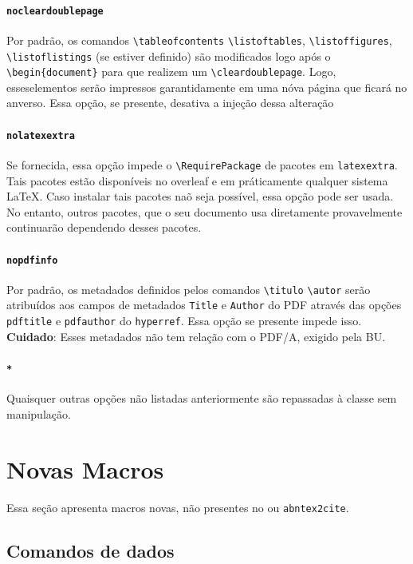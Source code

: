 \documentclass[embeddedlogo]{ufsc-thesis-rn46-2019}
\newcommand{\lacmd}[1]{\texttt{\textbackslash{}#1}}
\begin{document}
\paragraph*{\texttt{nocleardoublepage}} Por padrão, os comandos
\lacmd{tableofcontents} \lacmd{listoftables}, \lacmd{listoffigures},
\lacmd{listoflistings} (se estiver definido) são modificados logo após o
\lacmd{begin\{document\}} para que realizem um \lacmd{cleardoublepage}. Logo,
esseselementos serão impressos garantidamente em uma nóva página que ficará no
anverso. Essa opção, se presente, desativa a injeção dessa alteração

\paragraph*{\texttt{nolatexextra}}
Se fornecida, essa opção impede o \lacmd{RequirePackage} de pacotes em \texttt{latexextra}.
Tais pacotes estão disponíveis no overleaf e em práticamente qualquer sistema
\LaTeX. Caso instalar tais pacotes naõ seja possível, essa opção pode ser usada.
No entanto, outros pacotes, que o seu documento usa diretamente provavelmente
continuarão dependendo desses pacotes.

\paragraph*{\texttt{nopdfinfo}} Por padrão, os metadados definidos pelos
comandos \lacmd{titulo} \lacmd{autor} serão atribuídos aos campos de metadados
\texttt{Title} e \texttt{Author} do PDF através das opções \texttt{pdftitle} e
\texttt{pdfauthor} do \texttt{hyperref}. Essa opção se presente impede isso.
\textbf{Cuidado}: Esses metadados não tem relação com o PDF/A, exigido pela BU.

\paragraph*{\texttt{*}} Quaisquer outras opções não listadas anteriormente são
repassadas à classe \abnTeX{} sem manipulação.

\section{Novas Macros}

Essa seção apresenta macros novas, não presentes no \abnTeX{} ou
\texttt{abntex2cite}.

\subsection{Comandos de dados}
\label{sec:dados}
\end{document}
